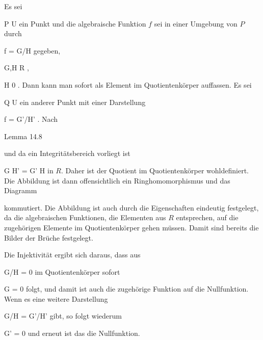 {





Es sei

\mavergleichskette
{\vergleichskette
{ P
}
{ \in }{ U
}
{  }{
}
{    }{
}
{   }{
}
}
{}{}{}
ein Punkt und die algebraische Funktion $f$ sei in einer Umgebung von $P$ durch

\mavergleichskette
{\vergleichskette
{ f
}
{ = }{ G/H
}
{  }{
}
{    }{
}
{   }{
}
}
{}{}{}
gegeben,

\mavergleichskette
{\vergleichskette
{ G,H
}
{ \in }{ R
}
{  }{
}
{    }{
}
{   }{
}
}
{}{}{,}

\mavergleichskette
{\vergleichskette
{ H
}
{ \neq }{ 0
}
{  }{
}
{    }{
}
{   }{
}
}
{}{}{.}
Dann kann man
 sofort als Element im Quotientenkörper auffassen. Es sei

\mavergleichskette
{\vergleichskette
{ Q
}
{ \in }{ U
}
{  }{
}
{    }{
}
{   }{
}
}
{}{}{}
ein anderer Punkt mit einer Darstellung

\mavergleichskette
{\vergleichskette
{ f
}
{ = }{ G'/H'
}
{  }{
}
{    }{
}
{   }{
}
}
{}{}{.}
Nach

Lemma 14.8

und da ein Integritätsbereich vorliegt ist

\mavergleichskette
{\vergleichskette
{ G H'
}
{ = }{ G' H
}
{  }{
}
{    }{
}
{   }{
}
}
{}{}{}
in $R$. Daher ist der Quotient im Quotientenkörper wohldefiniert. Die Abbildung ist dann offensichtlich ein Ringhomomorphismus und das Diagramm

 {  }

kommutiert. Die Abbildung ist auch durch die Eigenschaften eindeutig festgelegt, da die algebraischen Funktionen, die Elementen aus $R$ entsprechen, auf die zugehörigen Elemente im Quotientenkörper gehen müssen. Damit sind bereits die Bilder der Brüche festgelegt.

Die Injektivität ergibt sich daraus, dass aus

\mavergleichskette
{\vergleichskette
{ G/H
}
{ = }{ 0
}
{  }{
}
{    }{
}
{   }{
}
}
{}{}{}
im Quotientenkörper sofort

\mavergleichskette
{\vergleichskette
{ G
}
{ = }{ 0
}
{  }{
}
{    }{
}
{   }{
}
}
{}{}{}
folgt, und damit ist auch die zugehörige Funktion auf
 die Nullfunktion. Wenn es eine weitere Darstellung

\mavergleichskette
{\vergleichskette
{ G/H
}
{ = }{ G'/H'
}
{  }{
}
{    }{
}
{   }{
}
}
{}{}{}
gibt, so folgt wiederum

\mavergleichskette
{\vergleichskette
{ G'
}
{ = }{ 0
}
{  }{
}
{    }{
}
{   }{
}
}
{}{}{}
und erneut ist das die Nullfunktion.




}



